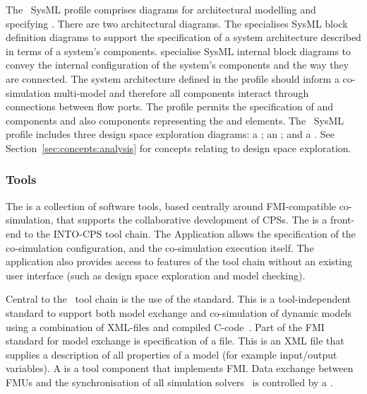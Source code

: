 The \into\ SysML profile comprises diagrams for architectural modelling and specifying . There are two architectural diagrams. The  specialises SysML block definition diagrams to support the specification of a system architecture described in terms of a system's components.  specialise SysML internal block diagrams to convey the internal configuration of the system's components and the way they are connected. The system architecture defined in the profile should inform a co-simulation multi-model and therefore all components interact through connections between flow ports. The profile permits the specification of  and  components and also components representing the  and  elements. The \into\ SysML profile includes three design space exploration diagrams: a ; an ; and a . See Section~\ref{sec:concepts:analysis} for concepts relating to design space exploration.


\subsubsection{Tools}
\label{sec:concepts:tools}

The  is a collection of software tools, based centrally around FMI-compatible co-simulation, that  supports the collaborative development of CPSs. The  is a front-end to the INTO-CPS tool chain. The Application allows the specification of the co-simulation configuration, and the co-simulation execution itself. The application also provides access to features of the tool chain without an existing user interface (such as design space exploration and model checking).

Central to the \into\ tool chain is the use of the  standard. This is a tool-independent standard to support both model exchange and co-simulation of dynamic models using a combination of XML-files and compiled C-code~\cite{FMIStandard2.0}. Part of the FMI standard for model exchange is specification of a  file. This is an XML file that supplies a description of all properties of a model (for example input/output variables). A  is a tool component that implements FMI. Data exchange between FMUs and the synchronisation of all simulation solvers~\cite{FMIStandard2.0} is controlled by a .

